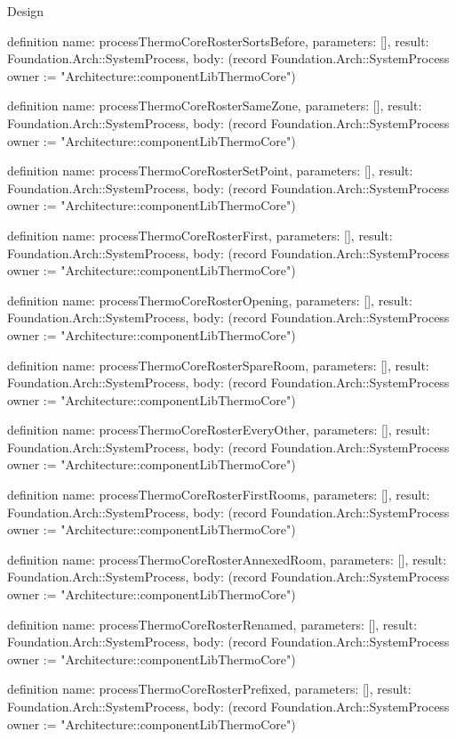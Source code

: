 \begin{lexlean}{Design}
\begin{semanticmodule}
definition{
  name: processThermoCoreRosterSortsBefore,
  parameters: [],
  result: Foundation.Arch::SystemProcess,
  body: (record Foundation.Arch::SystemProcess {owner := "Architecture::componentLibThermoCore"})
}

definition{
  name: processThermoCoreRosterSameZone,
  parameters: [],
  result: Foundation.Arch::SystemProcess,
  body: (record Foundation.Arch::SystemProcess {owner := "Architecture::componentLibThermoCore"})
}

definition{
  name: processThermoCoreRosterSetPoint,
  parameters: [],
  result: Foundation.Arch::SystemProcess,
  body: (record Foundation.Arch::SystemProcess {owner := "Architecture::componentLibThermoCore"})
}

definition{
  name: processThermoCoreRosterFirst,
  parameters: [],
  result: Foundation.Arch::SystemProcess,
  body: (record Foundation.Arch::SystemProcess {owner := "Architecture::componentLibThermoCore"})
}

definition{
  name: processThermoCoreRosterOpening,
  parameters: [],
  result: Foundation.Arch::SystemProcess,
  body: (record Foundation.Arch::SystemProcess {owner := "Architecture::componentLibThermoCore"})
}

definition{
  name: processThermoCoreRosterSpareRoom,
  parameters: [],
  result: Foundation.Arch::SystemProcess,
  body: (record Foundation.Arch::SystemProcess {owner := "Architecture::componentLibThermoCore"})
}

definition{
  name: processThermoCoreRosterEveryOther,
  parameters: [],
  result: Foundation.Arch::SystemProcess,
  body: (record Foundation.Arch::SystemProcess {owner := "Architecture::componentLibThermoCore"})
}

definition{
  name: processThermoCoreRosterFirstRooms,
  parameters: [],
  result: Foundation.Arch::SystemProcess,
  body: (record Foundation.Arch::SystemProcess {owner := "Architecture::componentLibThermoCore"})
}

definition{
  name: processThermoCoreRosterAnnexedRoom,
  parameters: [],
  result: Foundation.Arch::SystemProcess,
  body: (record Foundation.Arch::SystemProcess {owner := "Architecture::componentLibThermoCore"})
}

definition{
  name: processThermoCoreRosterRenamed,
  parameters: [],
  result: Foundation.Arch::SystemProcess,
  body: (record Foundation.Arch::SystemProcess {owner := "Architecture::componentLibThermoCore"})
}

definition{
  name: processThermoCoreRosterPrefixed,
  parameters: [],
  result: Foundation.Arch::SystemProcess,
  body: (record Foundation.Arch::SystemProcess {owner := "Architecture::componentLibThermoCore"})
}


\end{semanticmodule}
\end{lexlean}
